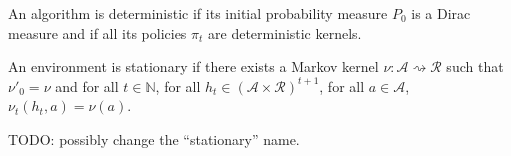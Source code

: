 \begin{definition}\label{def:detAlgorithm}
  \leanok
An algorithm is deterministic if its initial probability measure $P_0$ is a Dirac measure and if all its policies $\pi_t$ are deterministic kernels.
\end{definition}


\begin{definition}\label{def:stationaryEnv}
  \leanok
An environment is stationary if there exists a Markov kernel $\nu : \mathcal{A} \rightsquigarrow \mathcal{R}$ such that $\nu'_0 = \nu$ and for all $t \in \mathbb{N}$, for all $h_t \in (\mathcal{A} \times \mathcal{R})^{t+1}$, for all $a \in \mathcal{A}$, $\nu_t(h_t, a) = \nu(a)$.
\end{definition}

TODO: possibly change the ``stationary'' name.


